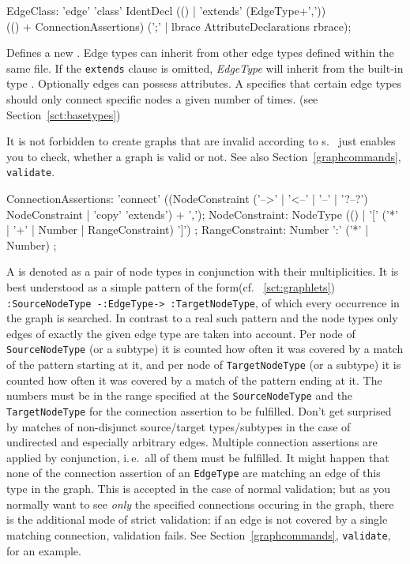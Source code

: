 \begin{rail}    
  EdgeClass: 'edge' 'class' IdentDecl (() | 'extends' (EdgeType+',')) \\
    (() + ConnectionAssertions) (';' | lbrace AttributeDeclarations rbrace);
\end{rail}
Defines a new .
Edge types can inherit from other edge types defined within the same file.
If the \texttt{extends} clause is omitted, \emph{EdgeType} will inherit from the built-in type \texttt{}.
Optionally edges can possess attributes.
A  specifies that certain edge types should only connect specific nodes a given number of times.
(see Section~\ref{sct:basetypes})

\begin{note}
It is not forbidden to create graphs that are invalid according to s.
\GrG\ just enables you to check, whether a graph is valid or not.
See also Section~\ref{graphcommands}, \texttt{validate}.
\end{note}

\begin{rail}  
  ConnectionAssertions: 'connect' ((NodeConstraint ('-->' | '<--' | '--' | '?--?') NodeConstraint | 'copy' 'extends') + ',');
  NodeConstraint: NodeType (() | '[' ('*' | '+' | Number | RangeConstraint) ']') ;
  RangeConstraint: Number ':' ('*' | Number) ;
\end{rail}
A \emph{} is denoted as a pair of node types in conjunction with their multiplicities. 
It is best understood as a simple pattern of the form(cf. ~\ref{sct:graphlets}) \texttt{:SourceNodeType -:EdgeType-> :TargetNodeType}, of which every occurrence in the graph is searched.
In contrast to a real such pattern and the node types only edges of exactly the given edge type are taken into account.
Per node of \texttt{SourceNodeType} (or a subtype) it is counted how often it was covered by a match of the pattern starting at it,
and per node of \texttt{TargetNodeType} (or a subtype) it is counted how often it was covered by a match of the pattern ending at it.
The numbers must be in the range specified at the \texttt{SourceNodeType} and the \texttt{TargetNodeType} for the connection assertion to be fulfilled.
Don't get surprised by matches of non-disjunct source/target types/subtypes in the case of undirected and especially arbitrary edges.
Multiple connection assertions are applied by conjunction, i.\,e.\ all of them must be fulfilled. 
It might happen that none of the connection assertion of an \texttt{EdgeType} are matching an edge of this type in the graph.
This is accepted in the case of normal validation; but as you normally want to see \emph{only} the specified connections occuring in the graph,
there is the additional mode of strict validation: if an edge is not covered by a single matching connection, validation fails.
See Section~\ref{graphcommands}, \texttt{validate}, for an example.
 
